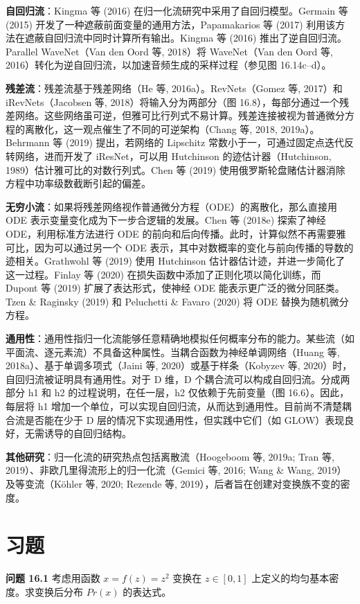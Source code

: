 \documentclass[lang=cn,newtx,10pt,scheme=chinese]{elegantbook}
\begin{document}
\textbf{自回归流}：Kingma 等 (2016) 在归一化流研究中采用了自回归模型。Germain 等 (2015) 开发了一种遮蔽前面变量的通用方法，Papamakarios 等 (2017) 利用该方法在遮蔽自回归流中同时计算所有输出。Kingma 等 (2016) 推出了逆自回归流。Parallel WaveNet（Van den Oord 等, 2018）将 WaveNet（Van den Oord 等, 2016）转化为逆自回归流，以加速音频生成的采样过程（参见图 16.14c–d）。

\textbf{残差流}：残差流基于残差网络（He 等, 2016a）。RevNets（Gomez 等, 2017）和 iRevNets（Jacobsen 等, 2018）将输入分为两部分（图 16.8），每部分通过一个残差网络。这些网络虽可逆，但雅可比行列式不易计算。残差连接被视为普通微分方程的离散化，这一观点催生了不同的可逆架构（Chang 等, 2018, 2019a）。Behrmann 等 (2019) 提出，若网络的 Lipschitz 常数小于一，可通过固定点迭代反转网络，进而开发了 iResNet，可以用 Hutchinson 的迹估计器（Hutchinson, 1989）估计雅可比的对数行列式。Chen 等 (2019) 使用俄罗斯轮盘赌估计器消除方程中功率级数截断引起的偏差。

\textbf{无穷小流}：如果将残差网络视作普通微分方程（ODE）的离散化，那么直接用 ODE 表示变量变化成为下一步合逻辑的发展。Chen 等 (2018e) 探索了神经 ODE，利用标准方法进行 ODE 的前向和后向传播。此时，计算似然不再需要雅可比，因为可以通过另一个 ODE 表示，其中对数概率的变化与前向传播的导数的迹相关。Grathwohl 等 (2019) 使用 Hutchinson 估计器估计迹，并进一步简化了这一过程。Finlay 等 (2020) 在损失函数中添加了正则化项以简化训练，而 Dupont 等 (2019) 扩展了表达形式，使神经 ODE 能表示更广泛的微分同胚类。Tzen \& Raginsky (2019) 和 Peluchetti \& Favaro (2020) 将 ODE 替换为随机微分方程。

\textbf{通用性}：通用性指归一化流能够任意精确地模拟任何概率分布的能力。某些流（如平面流、逐元素流）不具备这种属性。当耦合函数为神经单调网络（Huang 等, 2018a）、基于单调多项式（Jaini 等, 2020）或基于样条（Kobyzev 等, 2020）时，自回归流被证明具有通用性。对于 D 维，D 个耦合流可以构成自回归流。分成两部分 h1 和 h2 的过程说明，在任一层，h2 仅依赖于先前变量（图 16.6）。因此，每层将 h1 增加一个单位，可以实现自回归流，从而达到通用性。目前尚不清楚耦合流是否能在少于 D 层的情况下实现通用性，但实践中它们（如 GLOW）表现良好，无需诱导的自回归结构。

\textbf{其他研究}：归一化流的研究热点包括离散流（Hoogeboom 等, 2019a; Tran 等, 2019）、非欧几里得流形上的归一化流（Gemici 等, 2016; Wang \& Wang, 2019）及等变流（Köhler 等, 2020; Rezende 等, 2019），后者旨在创建对变换族不变的密度。

\section{习题}
\textbf{问题 16.1} 考虑用函数 \(x = f(z) = z^2\) 变换在 \(z \in [0, 1]\) 上定义的均匀基本密度。求变换后分布 \(Pr(x)\) 的表达式。
\end{document}
